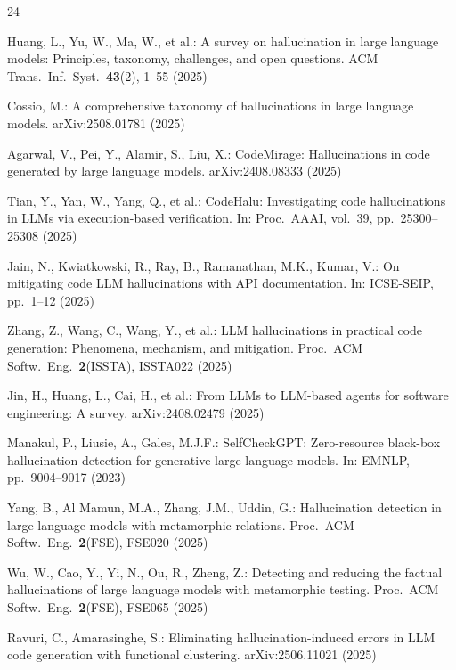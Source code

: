 \documentclass[runningheads]{llncs}
\begin{document}
\begin{thebibliography}{24}

Huang, L., Yu, W., Ma, W., et al.: A survey on hallucination in large language models: Principles, taxonomy, challenges, and open questions. ACM Trans.\ Inf.\ Syst.\ \textbf{43}(2), 1--55 (2025)

Cossio, M.: A comprehensive taxonomy of hallucinations in large language models. arXiv:2508.01781 (2025)

Agarwal, V., Pei, Y., Alamir, S., Liu, X.: CodeMirage: Hallucinations in code generated by large language models. arXiv:2408.08333 (2025)

Tian, Y., Yan, W., Yang, Q., et al.: CodeHalu: Investigating code hallucinations in LLMs via execution-based verification. In: Proc.\ AAAI, vol.~39, pp.~25300--25308 (2025)

Jain, N., Kwiatkowski, R., Ray, B., Ramanathan, M.K., Kumar, V.: On mitigating code LLM hallucinations with API documentation. In: ICSE-SEIP, pp.~1--12 (2025)

Zhang, Z., Wang, C., Wang, Y., et al.: LLM hallucinations in practical code generation: Phenomena, mechanism, and mitigation. Proc.\ ACM Softw.\ Eng.\ \textbf{2}(ISSTA), ISSTA022 (2025)

Jin, H., Huang, L., Cai, H., et al.: From LLMs to LLM-based agents for software engineering: A survey. arXiv:2408.02479 (2025)

Manakul, P., Liusie, A., Gales, M.J.F.: SelfCheckGPT: Zero-resource black-box hallucination detection for generative large language models. In: EMNLP, pp.~9004--9017 (2023)

Yang, B., Al Mamun, M.A., Zhang, J.M., Uddin, G.: Hallucination detection in large language models with metamorphic relations. Proc.\ ACM Softw.\ Eng.\ \textbf{2}(FSE), FSE020 (2025)

Wu, W., Cao, Y., Yi, N., Ou, R., Zheng, Z.: Detecting and reducing the factual hallucinations of large language models with metamorphic testing. Proc.\ ACM Softw.\ Eng.\ \textbf{2}(FSE), FSE065 (2025)

Ravuri, C., Amarasinghe, S.: Eliminating hallucination-induced errors in LLM code generation with functional clustering. arXiv:2506.11021 (2025)


\end{thebibliography}
\end{document}
